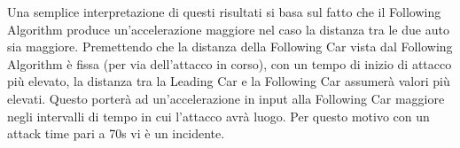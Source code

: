   
Una semplice interpretazione di questi risultati si basa sul fatto che il Following Algorithm produce un'accelerazione maggiore nel caso la distanza tra le due auto sia maggiore. Premettendo che la distanza della Following Car vista dal Following Algorithm è fissa (per via dell'attacco in corso), con un tempo di inizio di attacco più elevato, la distanza tra la Leading Car e la Following Car assumerà valori più elevati. Questo porterà ad un'accelerazione in input alla Following Car maggiore negli intervalli di tempo in cui l'attacco avrà luogo. Per questo motivo con un attack time pari a 70s vi è un incidente.